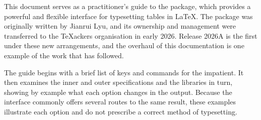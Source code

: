 \documentclass[12pt, oneside]{TabularrayDoc}
\begin{document}
\frontmatter
\begin{titlepage}
	\begin{tsabstract}
		This document serves as a practitioner's guide to the  package, which provides a powerful and flexible interface for typesetting tables in \LaTeX. The package was originally written by Jianrui Lyu, and its ownership and management were transferred to the TeXackers organisation in early 2026. Release 2026A is the first under these new arrangements, and the overhaul of this documentation is one example of the work that has followed.

		The guide begins with a brief list of keys and commands for the impatient. It then examines the inner and outer specifications and the libraries in turn, showing by example what each option changes in the output. Because the interface commonly offers several routes to the same result, these examples illustrate each option and do not prescribe a correct method of typesetting.
	\end{tsabstract}
\end{titlepage}

\tableofcontents\cleardoublepage

\mainmatter





\backmatter
\cleardoublepage
\printindex
\end{document}

